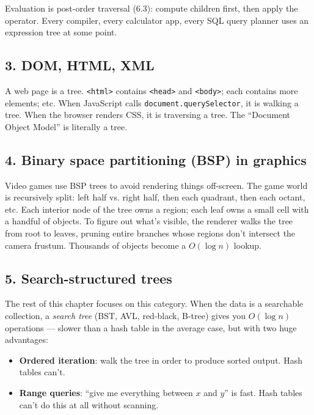 \documentclass[11pt]{article}
\begin{document}
Evaluation is post-order traversal (6.3): compute children first,
then apply the operator. Every compiler, every calculator app,
every SQL query planner uses an expression tree at some point.

\subsection*{3. DOM, HTML, XML}

A web page is a tree. \texttt{<html>} contains \texttt{<head>}
and \texttt{<body>}; each contains more elements; etc. When
JavaScript calls \texttt{document.querySelector}, it is walking
a tree. When the browser renders CSS, it is traversing a tree.
The ``Document Object Model'' is literally a tree.

\subsection*{4. Binary space partitioning (BSP) in graphics}

Video games use BSP trees to avoid rendering things off-screen.
The game world is recursively split: left half vs. right half,
then each quadrant, then each octant, etc. Each interior node
of the tree owns a region; each leaf owns a small cell with a
handful of objects. To figure out what's visible, the renderer
walks the tree from root to leaves, pruning entire branches
whose regions don't intersect the camera frustum. Thousands of
objects become a $O(\log n)$ lookup.

\subsection*{5. Search-structured trees}

The rest of this chapter focuses on this category. When the data
is a searchable collection, a \emph{search tree} (BST, AVL,
red-black, B-tree) gives you $O(\log n)$ operations --- slower
than a hash table in the average case, but with two huge
advantages:

\begin{itemize}[leftmargin=*]
    \item \textbf{Ordered iteration}: walk the tree in order to
          produce sorted output. Hash tables can't.
    \item \textbf{Range queries}: ``give me everything between
          $x$ and $y$'' is fast. Hash tables can't do this at
          all without scanning.
\end{itemize}
\end{document}
